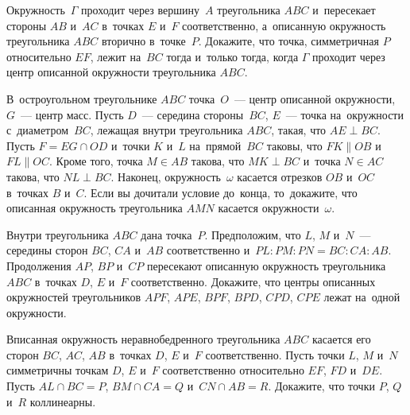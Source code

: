 \begin{problems}
\item
Окружность~$\Gamma$ проходит через вершину~$A$ треугольника $ABC$
и~пересекает стороны $AB$ и~$AC$ в~точках $E$ и~$F$ соответственно,
а~описанную окружность треугольника $ABC$ вторично в~точке~$P$.
Докажите, что точка, симметричная $P$ относительно $EF$, лежит на~$BC$
тогда и~только тогда, когда $\Gamma$ проходит через центр описанной
окружности треугольника $ABC$.

\item
В~остроугольном треугольнике $ABC$ точка~$O$~--- центр описанной окружности,
$G$~--- центр масс.
Пусть $D$~--- середина стороны~$BC$, $E$~--- точка на~окружности
с~диаметром~$BC$, лежащая внутри треугольника $ABC$, такая, что $AE \perp BC$.
Пусть $F = EG \cap OD$ и~точки $K$ и~$L$ на~прямой~$BC$ таковы, что
$FK \parallel OB$ и~$FL \parallel OC$.
Кроме того, точка $M \in AB$ такова, что $MK \perp BC$
и~точка $N \in AC$ такова, что $NL \perp BC$.
Наконец, окружность~$\omega$ касается отрезков $OB$ и~$OC$ в~точках $B$ и~$C$.
Если вы дочитали условие до~конца, то~докажите, что описанная окружность
треугольника $AMN$ касается окружности~$\omega$.

\item
Внутри треугольника $ABC$ дана точка~$P$.
Предположим, что $L$, $M$ и~$N$~--- середины сторон $BC$, $CA$ и~$AB$
соответственно и~$PL : PM : PN = BC : CA : AB$.
Продолжения $AP$, $BP$ и~$CP$ пересекают описанную окружность треугольника
$ABC$ в~точках $D$, $E$ и~$F$ соответственно.
Докажите, что центры описанных окружностей
треугольников $APF$, $APE$, $BPF$, $BPD$, $CPD$, $CPE$ лежат на~одной
окружности.

\item
Вписанная окружность неравнобедренного треугольника $ABC$ касается его
сторон $BC$, $AC$, $AB$ в~точках $D$, $E$ и~$F$ соответственно.
Пусть точки $L$, $M$ и~$N$ симметричны точкам $D$, $E$ и~$F$ соответственно
относительно $EF$, $FD$ и~$DE$.
Пусть $AL \cap BC = P$, $BM \cap CA = Q$ и~$CN \cap AB = R$.
Докажите, что точки $P$, $Q$ и~$R$ коллинеарны.

\end{problems}

